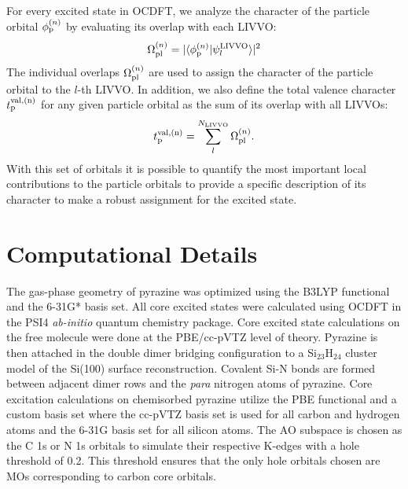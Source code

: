 \documentclass{article}
\begin{document}
For every excited state in OCDFT, we analyze the character of the particle orbital $\phi^{(n)}_{\rm p}$ by evaluating its overlap with each LIVVO:
\begin{equation}
\Omega^{(n)}_{\rm{p}l} = |\langle \phi^{(n)}_{\rm p}|\psi^{\rm LIVVO}_l \rangle|^2
\end{equation}
The individual overlaps $\Omega^{(n)}_{\rm{p}l}$ are used to assign the character of the particle orbital to the $l$-th LIVVO. In addition, we also define the total valence character $t^{\rm val,(n)}_{\rm p}$ for any given particle orbital as the sum of its overlap with all LIVVOs:
\begin{equation}
t^{\rm val, (n)}_{\rm p} = \sum_l^{N_{\rm LIVVO}} \Omega^{(n)}_{\rm pl}.
\end{equation}
With this set of orbitals it is possible to quantify the most important local contributions to the particle orbitals to provide a specific description of its character to make a robust assignment for the excited state.
\section{Computational Details}
The gas-phase geometry of pyrazine was optimized using the B3LYP \cite{becke_new_1993,lee_development_1988,vosko_accurate_1980,stephens_ab_1994} functional and the 6-31G*\cite{rassolov_6-31g*_1998,hariharan_influence_1973,francl_selfconsistent_1982} basis set.  All core excited states were calculated using OCDFT in the PSI4 \textit{ab-initio} quantum chemistry package.\cite{turney_psi4:_2012} Core excited state calculations on the free molecule were done at the PBE/cc-pVTZ\cite{perdew_generalized_1996,dunning_gaussian_1989} level of theory. Pyrazine is then attached in the double dimer bridging configuration to a Si$_{23}$H$_{24}$ cluster model of the Si(100) surface reconstruction. Covalent Si-N bonds are formed between adjacent dimer rows and the \textit{para} nitrogen atoms of pyrazine. Core excitation calculations on chemisorbed pyrazine utilize the PBE functional\cite{perdew_generalized_1996} and a custom basis set where the cc-pVTZ basis set\cite{dunning_gaussian_1989} is used for all carbon and hydrogen atoms and the 6-31G basis set\cite{hehre_selfconsistent_1972} for all silicon atoms. The AO subspace is chosen as the C 1s or N 1s orbitals to simulate their respective K-edges with a hole threshold of 0.2. This threshold ensures that the only hole orbitals chosen are MOs corresponding to carbon core orbitals. 
\end{document}

